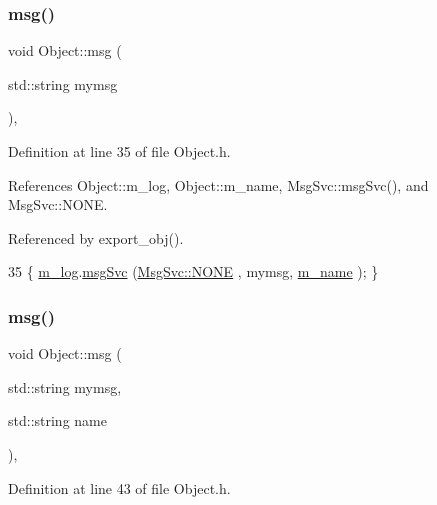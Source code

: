 \subsubsection{\texorpdfstring{msg()}{msg()}\hspace{0.1cm}{\footnotesize\ttfamily [1/2]}}
{\footnotesize\ttfamily void Object\+::msg (\begin{DoxyParamCaption}\item[{std\+::string}]{mymsg }\end{DoxyParamCaption})\hspace{0.3cm}{\ttfamily [inline]}, {\ttfamily [inherited]}}



Definition at line 35 of file Object.\+h.



References Object\+::m\+\_\+log, Object\+::m\+\_\+name, Msg\+Svc\+::msg\+Svc(), and Msg\+Svc\+::\+N\+O\+NE.



Referenced by export\+\_\+obj().


\begin{DoxyCode}
35 \{ \hyperlink{classObject_a0d269813dd7ac1f24bc143031e2963f2}{m\_log}.\hyperlink{classMsgSvc_ad25f18047920cc59a314e5098259711c}{msgSvc} (\hyperlink{classMsgSvc_ae671eb7301996cd049d2da8a65925926a9be9ae32fed8e1e6eba4a58692210fbd}{MsgSvc::NONE}    , mymsg, \hyperlink{classObject_a8b83c95c705d2c3ba0d081fe1710f48d}{m\_name} ); \}
\end{DoxyCode}
\mbox{\label{classObject_ac5d59299273cee27aacf7de00d2e7034}} 
\subsubsection{\texorpdfstring{msg()}{msg()}\hspace{0.1cm}{\footnotesize\ttfamily [2/2]}}
{\footnotesize\ttfamily void Object\+::msg (\begin{DoxyParamCaption}\item[{std\+::string}]{mymsg,  }\item[{std\+::string}]{name }\end{DoxyParamCaption})\hspace{0.3cm}{\ttfamily [inline]}, {\ttfamily [inherited]}}



Definition at line 43 of file Object.\+h.



